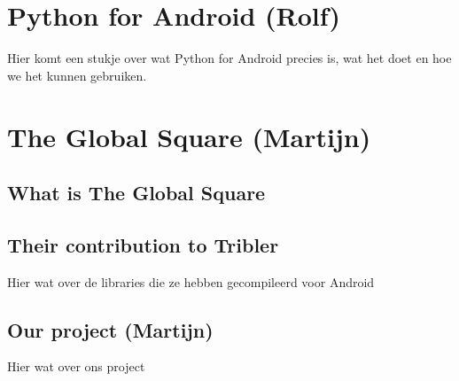 \documentclass[11pt]{article}
\begin{document}
\section{Python for Android (Rolf)}
Hier komt een stukje over wat Python for Android precies is, wat het doet en hoe we het kunnen gebruiken.

\section{The Global Square (Martijn)}

\subsection{What is The Global Square}

\subsection{Their contribution to Tribler}
Hier wat over de libraries die ze hebben gecompileerd voor Android

\subsection{Our project (Martijn)}
Hier wat over ons project
\end{document}
